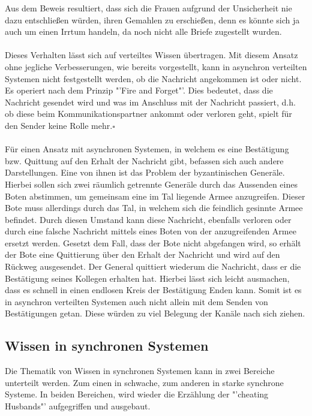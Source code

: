 Aus dem Beweis resultiert, dass sich die Frauen aufgrund der Unsicherheit nie dazu entschließen würden, ihren Gemahlen zu erschießen, denn es könnte sich ja auch um einen Irrtum handeln, da noch nicht alle Briefe zugestellt wurden.\\\\
Dieses Verhalten lässt sich auf verteiltes Wissen übertragen. Mit diesem Ansatz ohne jegliche Verbesserungen, wie bereits vorgestellt, kann in asynchron verteilten Systemen nicht festgestellt werden, ob die Nachricht angekommen ist oder nicht. Es operiert nach dem Prinzip "'Fire and Forget"'. Dies bedeutet, dass die Nachricht gesendet wird und was im Anschluss mit der Nachricht passiert, d.h. ob diese beim Kommunikationspartner ankommt oder verloren geht, spielt für den Sender keine Rolle mehr.$\square$\\\\
Für einen Ansatz mit asynchronen Systemen, in welchem es eine Bestätigung bzw. Quittung auf den Erhalt der Nachricht gibt, befassen sich auch andere Darstellungen. Eine von ihnen ist das Problem der byzantinischen Generäle. Hierbei sollen sich zwei räumlich getrennte Generäle durch das Aussenden eines Boten abstimmen, um gemeinsam eine im Tal liegende Armee anzugreifen. Dieser Bote muss allerdings durch das Tal, in welchem sich die feindlich gesinnte Armee befindet. Durch diesen Umstand kann diese Nachricht, ebenfalls verloren oder durch eine falsche Nachricht mittels eines Boten von der anzugreifenden Armee ersetzt werden. Gesetzt dem Fall, dass der Bote nicht abgefangen wird, so erhält der Bote eine Quittierung über den Erhalt der Nachricht und wird auf den Rückweg ausgesendet. Der General quittiert wiederum die Nachricht, dass er die Bestätigung seines Kollegen erhalten hat. Hierbei lässt sich leicht ausmachen, dass es schnell in einen endlosen Kreis der Bestätigung Enden kann. Somit ist es in asynchron verteilten Systemen auch nicht allein mit dem Senden von Bestätigungen getan. Diese würden zu viel Belegung der Kanäle nach sich ziehen.



\subsection{Wissen in synchronen Systemen}
\label{wissen_sync}
Die Thematik von Wissen in synchronen Systemen kann in zwei Bereiche unterteilt werden. Zum einen in schwache, zum anderen in starke synchrone Systeme. In beiden Bereichen, wird wieder die Erzählung der "'cheating Husbands"' aufgegriffen und ausgebaut.
